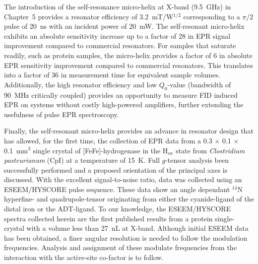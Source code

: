 The introduction of the self-resonance micro-helix at X-band (9.5~GHz) in Chapter~5 provides a resonator efficiency of 3.2~mT/W$^{1/2}$ corresponding to a $\pi/2$ pulse of 20~ns with an incident power of 20~mW. The self-resonant micro-helix exhibits an absolute sensitivity increase up to a factor of 28 in EPR signal improvement compared to commercial resonators. For samples that saturate readily, such as protein samples, the micro-helix provides a factor of 6 in absolute EPR sensitivity improvement compared to commercial resonators. This translates into a factor of 36 in measurement time for equivalent sample volumes. Additionally, the high resonator efficiency and low $Q_0$-value (bandwidth of 90~MHz critically coupled) provides an opportunity to measure FID induced EPR on systems without costly high-powered amplifiers, further extending the usefulness of pulse EPR spectroscopy.

Finally, the self-resonant micro-helix provides an advance in resonator design that has allowed, for the first time, the collection of EPR data from a 0.3 $\times$ 0.1 $\times$ 0.1~mm$^3$ single crystal of [FeFe]-hydrogenase in the H$_{ox}$ state from {\em Clostridium pasteurianum} (CpI) at a temperature of 15~K. Full $g$-tensor analysis been successfully performed and a proposed orientation of the principal axes is discussed. With the excellent signal-to-noise ratio, data was collected using an ESEEM/HYSCORE pulse sequence. These data show an angle dependant $^{14}$N hyperfine- and quadrupole-tensor originating from either the cyanide-ligand of the distal iron or the ADT-ligand.  To our knowledge, the ESEEM/HYSCORE spectra collected herein are the first published results from a protein single-crystal with a volume less than 27~nL at X-band. Although initial ESEEM data has been obtained, a finer angular resolution is needed to follow the modulation frequencies. Analysis and assignment of these modulate frequencies from the interaction with the active-site co-factor is to follow. 

